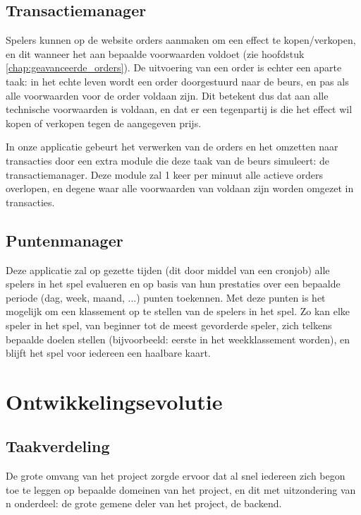 \section{Transactiemanager}
Spelers kunnen op de website orders aanmaken om een effect te kopen/verkopen, en dit wanneer het aan bepaalde voorwaarden voldoet (zie hoofdstuk \ref{chap:geavanceerde_orders}). De uitvoering van een order is echter een aparte taak: in het echte leven wordt een order doorgestuurd naar de beurs, en pas als alle voorwaarden voor de order voldaan zijn. Dit betekent dus dat aan alle technische voorwaarden is voldaan, en dat er een tegenpartij is die het effect wil kopen of verkopen tegen de aangegeven prijs.

In onze applicatie gebeurt het verwerken van de orders en het omzetten naar transacties door een extra module die deze taak van de beurs simuleert: de transactiemanager. Deze module zal 1 keer per minuut alle actieve orders overlopen, en degene waar alle voorwaarden van voldaan zijn worden omgezet in transacties.

\section{Puntenmanager}
Deze applicatie zal op gezette tijden (dit door middel van een cronjob) alle spelers in het spel evalueren en op basis van hun prestaties over een bepaalde periode (dag, week, maand, ...) punten toekennen. Met deze punten is het mogelijk om een klassement op te stellen van de spelers in het spel. Zo kan elke speler in het spel, van beginner tot de meest gevorderde speler, zich telkens bepaalde doelen stellen (bijvoorbeeld: eerste in het weekklassement worden), en blijft het spel voor iedereen een haalbare kaart.


\chapter{Ontwikkelingsevolutie}


\section{Taakverdeling}
De grote omvang van het project zorgde ervoor dat al snel iedereen zich begon toe te leggen op bepaalde domeinen van het project, en dit met uitzondering van n onderdeel: de grote gemene deler van het project, de backend.


